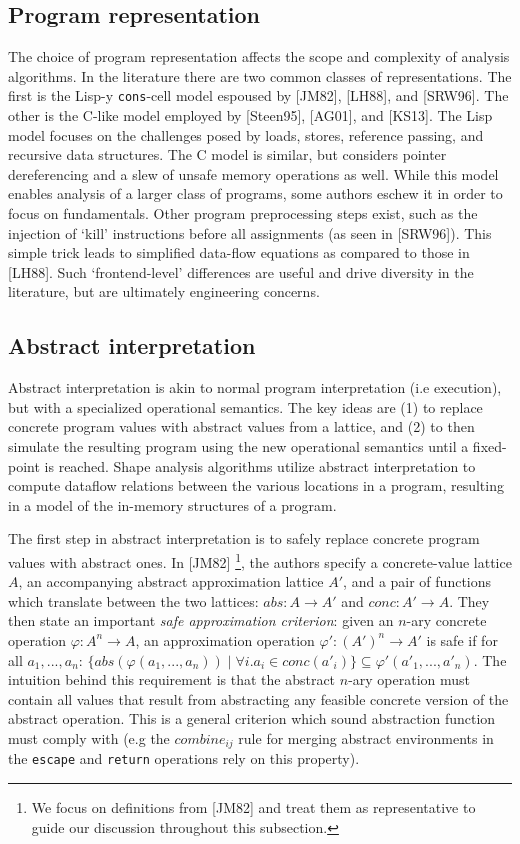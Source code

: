 \documentclass{article}
\begin{document}
\subsection{Program representation}

The choice of program representation affects the scope and complexity of
analysis algorithms. In the literature there are two common classes of
representations. The first is the Lisp-y \texttt{cons}-cell model espoused
by [JM82], [LH88], and [SRW96]. The other is the C-like model employed by
[Steen95], [AG01], and [KS13]. The Lisp model focuses on the challenges
posed by loads, stores, reference passing, and recursive data structures.
The C model is similar, but considers pointer dereferencing and a slew of
unsafe memory operations as well. While this model enables analysis of a
larger class of programs, some authors eschew it in order to focus on
fundamentals.  Other program preprocessing steps exist, such as the
injection of `kill' instructions before all assignments (as seen in
[SRW96]). This simple trick leads to simplified data-flow equations as
compared to those in [LH88]. Such `frontend-level' differences are useful
and drive diversity in the literature, but are ultimately engineering
concerns.

\subsection{Abstract interpretation}

Abstract interpretation is akin to normal program interpretation (i.e
execution), but with a specialized operational semantics. The key ideas are
(1) to replace concrete program values with abstract values from a lattice,
and (2) to then simulate the resulting program using the new operational
semantics until a fixed-point is reached. Shape analysis algorithms utilize
abstract interpretation to compute dataflow relations between the various
locations in a program, resulting in a model of the in-memory structures of
a program.

The first step in abstract interpretation is to safely replace concrete
program values with abstract ones. In [JM82] \footnote{We focus on
definitions from [JM82] and treat them as representative to guide our
discussion throughout this subsection.}, the authors specify a
concrete-value lattice $A$, an accompanying abstract approximation lattice
$A'$, and a pair of functions which translate between the two lattices: $abs
: A \rightarrow A'$ and $conc : A' \rightarrow A$. They then state an
important \textit{safe approximation criterion}: given an $n$-ary concrete
operation $\varphi : A^n \rightarrow A$, an approximation operation
$\varphi' : (A')^n \rightarrow A'$ is safe if for all $a_1, ..., a_n$:
$\{abs(\varphi(a_1, ..., a_n)) \mid \forall i.  a_i \in conc(a'_i)\}
\subseteq \varphi'(a'_1, ..., a'_n)$. The intuition behind this requirement
is that the abstract $n$-ary operation must contain all values that result
from abstracting any feasible concrete version of the abstract operation.
This is a general criterion which sound abstraction function must comply
with (e.g the $combine_{ij}$ rule for merging abstract environments in the
\texttt{escape} and \texttt{return} operations rely on this property).
\end{document}
